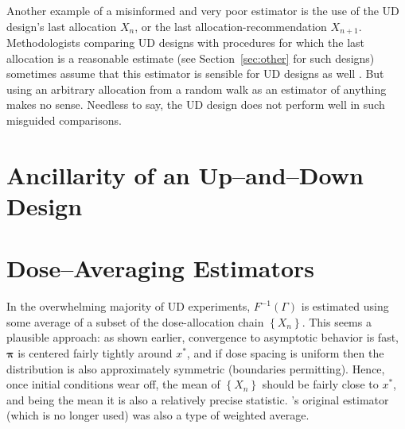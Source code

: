 Another example of a misinformed and very poor estimator is the use of the UD design's last allocation $X_n$, or the last allocation-recommendation $X_{n+1}$.  Methodologists comparing UD designs with procedures for which the last allocation is a reasonable estimate (see Section~\ref{sec:other} for such designs) sometimes assume that this estimator is sensible for UD designs as well \citep{O'Qu:Chev:meth:1991,Zack:stag:2009}. But using an arbitrary allocation from a random walk as an estimator of anything makes no sense. Needless to say, the UD design does not perform well in such misguided comparisons.

\section{Ancillarity of an Up--and--Down Design}

\section{Dose--Averaging Estimators}\label{sec:averaging}

In the overwhelming majority of UD experiments, $F^{-1}(\Gamma)$ is estimated using some average of a subset of the dose-allocation chain $\left\{X_n\right\}$. This seems a plausible approach: as shown earlier, convergence to asymptotic behavior is fast, $\boldsymbol{\pi}$ is centered fairly tightly around $x^*$, and if dose spacing is uniform then the distribution is also approximately symmetric (boundaries permitting). Hence, once initial conditions wear off, the mean of $\left\{X_n\right\}$ should be fairly close to $x^*$, and being the mean it is also a relatively precise statistic. \cite{Dixo:Mood:Amet:1948}'s original estimator (which is no longer used) was also a type of weighted average.

